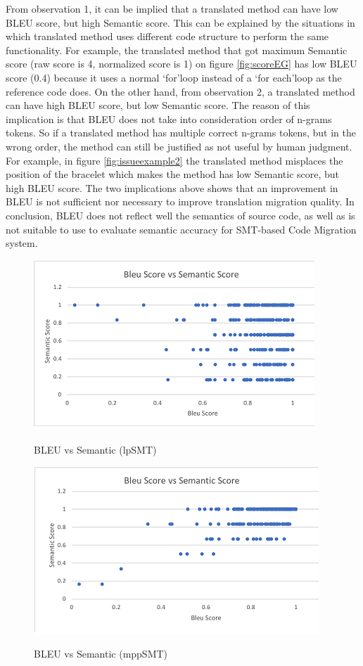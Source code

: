 From observation 1, it can be implied that a translated method can have low BLEU score, but high Semantic score. This can be explained by the situations in which translated method uses different code structure to perform the same functionality. For example, the translated method that got maximum Semantic score (raw score is 4, normalized score is 1) on figure \ref{fig:scoreEG} has low BLEU score (0.4) because it uses a normal \lq for\rq  loop instead of a \lq for each\rq  loop as the reference code does. On the other hand, from observation 2, a translated method can have high BLEU score, but low Semantic score. The reason of this implication is that BLEU does not take into consideration order of n-grams tokens. So if a translated method has multiple correct n-grams tokens, but in the wrong order, the method can still be justified as not useful by human judgment. For example, in figure \ref{fig:issueexample2} the translated method misplaces the position of the bracelet which makes the method has low Semantic score, but high BLEU score. The two implications above shows that an improvement in BLEU is not sufficient nor necessary to improve translation migration quality. In conclusion, BLEU does not reflect well the semantics of source code, as well as is not suitable to use to evaluate semantic accuracy for SMT-based Code Migration system.

 
\begin{figure}
\caption{BLEU vs Semantic (lpSMT)}
\centering
\includegraphics{img/bleuvssemantic_lpSMT.png}
\label{fig:BleuSemlpSMT}
\end{figure}

\begin{figure}
\caption{BLEU vs Semantic (mppSMT)}
\centering
\includegraphics{img/bleuvssemantic_mppSMT.png}
\label{fig:BleuSemMppSMT}
\end{figure}

